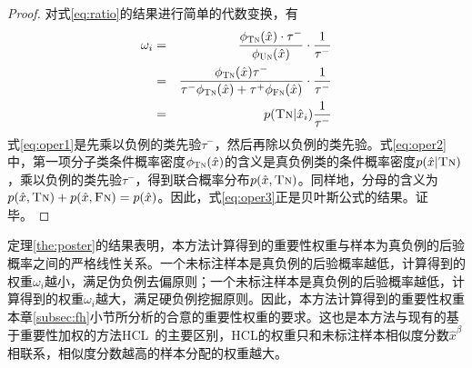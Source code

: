 \begin{theorem}[后验概率估计]
\begin{proof}
对式\ref{eq:ratio}的结果进行简单的代数变换，有
\begin{eqnarray}
\omega_i &=& \frac{\phi_\textsc{Tn}(\hat{x})\cdot \tau^-}{\phi_\textsc{Un}(\hat{x})} \cdot \frac{1}{\tau^-} \label{eq:oper1}\\
&=&\frac{\phi_\textsc{Tn}(\hat{x}) \tau^-}{\tau^-\phi_{\textsc{Tn}}(\hat{x})  +\tau^+\phi_{\textsc{Fn}}(\hat{x})} \cdot \frac{1}{\tau^-}\label{eq:oper2}\\
&=& p(\textsc{Tn}|\hat{x}_i) \frac{1}{\tau^-} \label{eq:oper3}
\end{eqnarray}
式\eqref{eq:oper1}是先乘以负例的类先验$\tau^-$，然后再除以负例的类先验。式\eqref{eq:oper2}中，第一项分子类条件概率密度$\phi_\textsc{Tn}(\hat{x})$的含义是真负例类的条件概率密度$p(\hat{x}|\textsc{Tn})$，乘以负例的类先验$\tau^-$，得到联合概率分布$p(\hat{x},\textsc{Tn})$。同样地，分母的含义为$p(\hat{x},\textsc{Tn})+p(\hat{x},\textsc{Fn})=p(\hat{x})$。因此，式\eqref{eq:oper3}正是贝叶斯公式的结果。证毕。
\end{proof}
\end{theorem}
定理\ref{the:poster}的结果表明，本方法计算得到的重要性权重与样本为真负例的后验概率之间的严格线性关系。一个未标注样本是真负例的后验概率越低，计算得到的权重$\omega_i$越小，满足伪负例去偏原则；一个未标注样本是真负例的后验概率越低，计算得到的权重$\omega_i$越大，满足硬负例挖掘原则。因此，本方法计算得到的重要性权重本章\ref{subsec:fh}小节所分析的合意的重要性权重的要求。这也是本方法与现有的基于重要性加权的方法HCL~\cite{Robinson:2021:ICLR}的主要区别，HCL的权重只和未标注样本相似度分数$\hat{x}^\beta$相联系，相似度分数越高的样本分配的权重越大。


